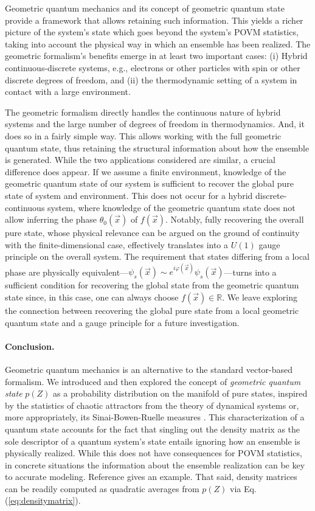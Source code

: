 \documentclass[nofootinbib,pre,twocolumn,showpacs,showkeys,groupaddress,preprintnumbers,floatfix]{revtex4-1}
\newcommand{\1}{\mathbbm{1}}
\begin{document}
Geometric quantum mechanics and its concept of geometric quantum state provide
a framework that allows retaining such information. This yields a richer
picture of the system's state which goes beyond the system's POVM statistics, 
taking into account the physical way in which an ensemble has been realized.
The geometric formalism's benefits emerge in at least two important cases:
(i) Hybrid continuous-discrete systems, e.g., electrons or other particles with
spin or other discrete degrees of freedom, and (ii) the thermodynamic setting
of a system in contact with a large environment.

The geometric formalism directly handles the continuous nature of hybrid
systems and the large number of degrees of freedom in thermodynamics. And, it
does so in a fairly simple way. This allows working with the full geometric
quantum state, thus retaining the structural information about how the ensemble
is generated. While the two applications considered are similar, a crucial
difference does appear. If we assume a finite environment, knowledge of the
geometric quantum state of our system is sufficient to recover the global pure
state of system and environment. This does not occur for a hybrid
discrete-continuous system, where knowledge of the geometric quantum state does
not allow inferring the phase $\theta_0(\vec{x})$ of $f(\vec{x})$. Notably,
fully recovering the overall pure state, whose physical relevance can be argued
on the ground of continuity with the finite-dimensional case, effectively
translates into a $U(1)$ gauge principle on the overall system. The requirement
that states differing from a local phase are physically
equivalent---$\psi_s(\vec{x}) \sim
e^{i\varphi(\vec{x})}\psi_s(\vec{x})$---turns into a sufficient condition for
recovering the global state from the geometric quantum state since, in this
case, one can always choose $f(\vec{x}) \in \mathbb{R}$. We leave exploring the
connection between recovering the global pure state from a local geometric
quantum state and a gauge principle for a future investigation.

\paragraph*{Conclusion.}
Geometric quantum mechanics is an alternative to the standard vector-based
formalism. We introduced and then explored the concept of \emph{geometric
quantum state} $p(Z)$ as a probability distribution on the manifold of pure
states, inspired by the statistics of chaotic attractors from the theory of
dynamical systems or, more appropriately, its Sinai-Bowen-Ruelle measures
\cite{Eckmann1985}. This characterization of a quantum state accounts for the
fact that singling out the density matrix as the sole descriptor of a quantum
system's state entails ignoring how an ensemble is physically realized. While
this does not have consequences for POVM statistics, in concrete situations the
information about the ensemble realization can be key to accurate modeling.
Reference \cite{Anza20c} gives an example. That said, density matrices can be
readily computed as quadratic averages from $p(Z)$ via Eq.
(\ref{eq:densitymatrix}).
\end{document}
